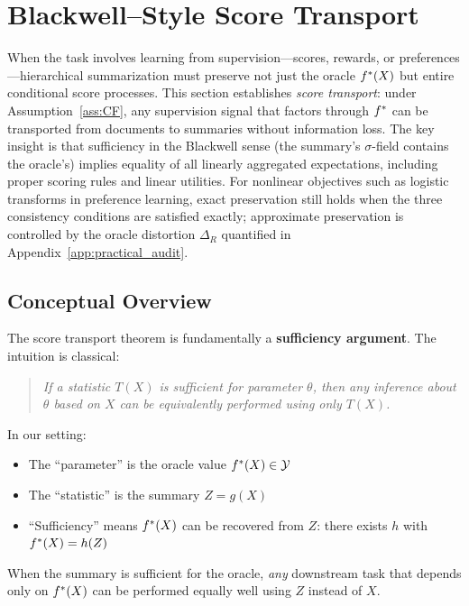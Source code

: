 \section{Blackwell–Style Score Transport}
\label{app:blackwell}

When the task involves learning from supervision—scores, rewards, or preferences—hierarchical summarization must preserve not just the oracle $f^{\ast}(X)$ but entire conditional score processes. This section establishes \emph{score transport}: under Assumption~\ref{ass:CF}, any supervision signal that factors through $f^{\ast}$ can be transported from documents to summaries without information loss. The key insight is that sufficiency in the Blackwell sense (the summary's $\sigma$-field contains the oracle's) implies equality of all linearly aggregated expectations, including proper scoring rules and linear utilities. For nonlinear objectives such as logistic transforms in preference learning, exact preservation still holds when the three consistency conditions are satisfied exactly; approximate preservation is controlled by the oracle distortion $\Delta_R$ quantified in Appendix~\ref{app:practical_audit}.

\subsection{Conceptual Overview}

The score transport theorem is fundamentally a \textbf{sufficiency argument}. The intuition is classical:

\begin{quote}
\emph{If a statistic $T(X)$ is sufficient for parameter $\theta$, then any inference about $\theta$ based on $X$ can be equivalently performed using only $T(X)$.}
\end{quote}

In our setting:
\begin{itemize}
    \item The ``parameter'' is the oracle value $f^{\ast}(X) \in \mathcal{Y}$
    \item The ``statistic'' is the summary $Z = g(X)$
    \item ``Sufficiency'' means $f^{\ast}(X)$ can be recovered from $Z$: there exists $h$ with $f^{\ast}(X) = h(Z)$
\end{itemize}

When the summary is sufficient for the oracle, \emph{any} downstream task that depends only on $f^{\ast}(X)$ can be performed equally well using $Z$ instead of $X$.

